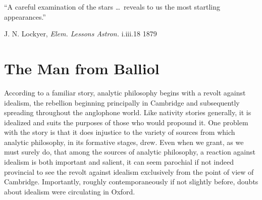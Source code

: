 \documentclass[12pt]{article}
\title{\mytitle} %
\author{\myauthor}
\date{} %
\begin{document}
\maketitle
\begin{abstract} %
\noindent In his 1904 letter to G.F. Stout, Cook Wilson distinguishes objective and subjective conceptions of appearance and provides a diagnosis for the modern acceptance of the subjective conception in terms of a confused misdescription of the objective appearances that perceptual experience affords. Moreover, Cook Wilson links subjective appearances with idealism, the suggestion being that perceptual appearances must be objective if they are to afford us with something akin to proof of a world without the mind.
\end{abstract} 
\epigraph{``A careful examination of the stars \ldots\ reveals to us the most startling appearances.''}{J. N. Lockyer, \emph{Elem. Lessons Astron.} i.iii.18 1879}

\setlength{\parindent}{1em}

\section{The Man from Balliol} %
\label{sec:the_balliol_man_in_a_ragged_scholar_s_gown}

According to a familiar story, analytic philosophy begins with a revolt against idealism, the rebellion beginning principally in Cambridge and subsequently spreading throughout the anglophone world. Like nativity stories generally, it is idealized and suits the purposes of those who would propound it. One problem with the story is that it does injustice to the variety of sources from which analytic philosophy, in its formative stages, drew. Even when we grant, as we must surely do, that among the sources of analytic philosophy, a reaction against idealism is both important and salient, it can seem parochial if not indeed provincial to see the revolt against idealism exclusively from the point of view of Cambridge. Importantly, roughly contemporaneously if not slightly before, doubts about idealism were circulating in Oxford. 
\end{document}

